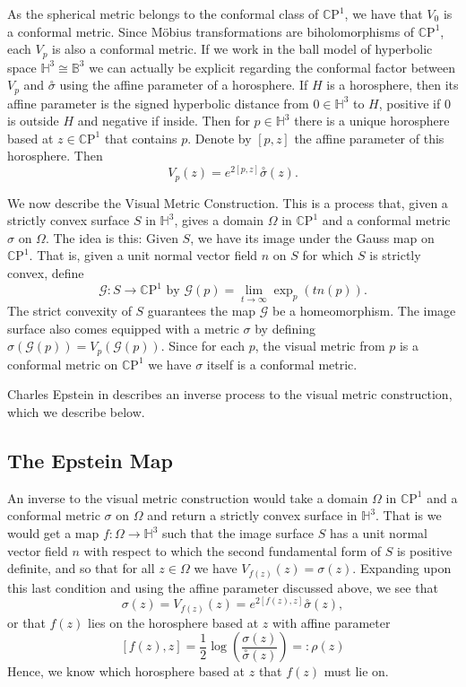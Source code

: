 \documentclass{amsart}
\newcommand{\CP}{\mathbb{C}\mathrm{P}}
\renewcommand{\H}{\mathbb{H}}
\begin{document}
As the spherical metric belongs to the conformal class of $\CP^1$, we have that $V_0$ is a conformal metric. 
Since M\"obius transformations are biholomorphisms of $\CP^1$, each $V_p$ is also a conformal metric. 
If we work in the ball model of hyperbolic space $\H^3 \cong \mathbb{B}^3$ we can actually be explicit regarding the conformal factor between $V_p$ and $\overset{\circ}{\sigma}$ using the affine parameter of a horosphere. 
If $H$ is a horosphere, then its affine parameter is the signed hyperbolic distance from $0 \in \H^3$ to $H$, positive if $0$ is outside $H$ and negative if inside. 
Then for $p \in \H^3$ there is a unique horosphere based at $z \in \CP^1$ that contains $p$. 
Denote by $[p,z]$ the affine parameter of this horosphere. 
Then
\[
V_p(z) = e^{2[p,z]}\overset{\circ}{\sigma}(z).
\]

We now describe the Visual Metric Construction. 
This is a process that, given a strictly convex surface $S$ in $\H^3$, gives a domain $\Omega$ in $\CP^1$ and a conformal metric $\sigma$ on $\Omega$.
The idea is this: Given $S$, we have its image under the Gauss map on $\CP^1$. 
That is, given a unit normal vector field $n$ on $S$ for which $S$ is strictly convex, define
\[
\mathcal{G}:S \to \CP^1 \text{ by } \mathcal{G}(p) = \lim_{t \to \infty} \exp_p(t n(p)).
\]
The strict convexity of $S$ guarantees the map $\mathcal{G}$ be a homeomorphism. 
The image surface also comes equipped with a metric $\sigma$ by defining $\sigma(\mathcal{G}(p)) = V_p(\mathcal{G}(p))$. 
Since for each $p$, the visual metric from $p$ is a conformal metric on $\CP^1$ we have $\sigma$ itself is a conformal metric. 

Charles Epstein in \cite{epstein1984} describes an inverse process to the visual metric construction, which we describe below.



\subsection{The Epstein Map}



An inverse to the visual metric construction would take a domain $\Omega$ in $\CP^1$ and a conformal metric $\sigma$ on $\Omega$ and return a strictly convex surface in $\H^3$. 
That is we would get a map $f: \Omega \to \H^3$ such that the image surface $S$ has a unit normal vector field $n$ with respect to which the second fundamental form of $S$ is positive definite, and so that for all $z \in \Omega$ we have $V_{f(z)}(z) = \sigma(z)$. 
Expanding upon this last condition and using the affine parameter discussed above, we see that 
\[
\sigma(z) = V_{f(z)}(z) = e^{2 [f(z),z]} \overset{\circ}{\sigma}(z),
\]
or that $f(z)$ lies on the horosphere based at $z$ with affine parameter
\[
[f(z),z] = \frac{1}{2} \log \left( \frac{\sigma(z)}{\overset{\circ}{\sigma}(z)} \right) =: \rho(z)
\]
Hence, we know which horosphere based at $z$ that $f(z)$ must lie on. 
\end{document}

